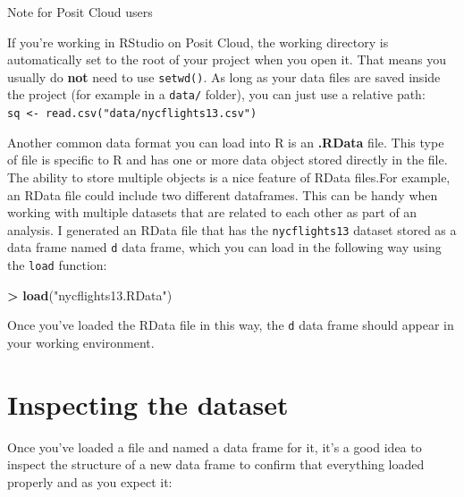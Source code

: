 \documentclass[
]{book}
\newenvironment{Shaded}{\begin{snugshade}}{\end{snugshade}}
\newcommand{\FunctionTok}[1]{\textcolor[rgb]{0.13,0.29,0.53}{\textbf{#1}}}
\newcommand{\NormalTok}[1]{#1}
\newcommand{\SpecialCharTok}[1]{\textcolor[rgb]{0.81,0.36,0.00}{\textbf{#1}}}
\newcommand{\StringTok}[1]{\textcolor[rgb]{0.31,0.60,0.02}{#1}}
\begin{document}
Note for Posit Cloud users

If you're working in RStudio on Posit Cloud, the working directory is automatically set to the root of your project when you open it. That means you usually do \textbf{not} need to use \texttt{setwd()}. As long as your data files are saved inside the project (for example in a \texttt{data/} folder), you can just use a relative path: \texttt{sq\ \textless{}-\ read.csv("data/nycflights13.csv")}

Another common data format you can load into R is an \textbf{.RData} file. This type of file is specific to R and has one or more data object stored directly in the file. The ability to store multiple objects is a nice feature of RData files.For example, an RData file could include two different dataframes. This can be handy when working with multiple datasets that are related to each other as part of an analysis. I generated an RData file that has the \texttt{nycflights13} dataset stored as a data frame named \texttt{d} data frame, which you can load in the following way using the \texttt{load} function:

\begin{Shaded}
\begin{Highlighting}[]
\SpecialCharTok{\textgreater{}} \FunctionTok{load}\NormalTok{(}\StringTok{"nycflights13.RData"}\NormalTok{)}
\end{Highlighting}
\end{Shaded}

Once you've loaded the RData file in this way, the \texttt{d} data frame should appear in your working environment.

\section{Inspecting the dataset}\label{inspecting-the-dataset}

Once you've loaded a file and named a data frame for it, it's a good idea to inspect the structure of a new data frame to confirm that everything loaded properly and as you expect it:
\end{document}
